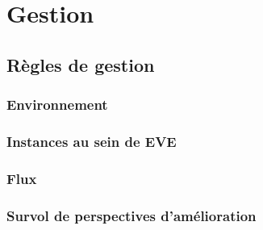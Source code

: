 \section{Gestion}
\subsection{Règles de gestion}
\subsubsection{Environnement}
\subsubsection{Instances au sein de EVE}
\subsubsection{Flux}
\subsubsection{Survol de perspectives d'amélioration}